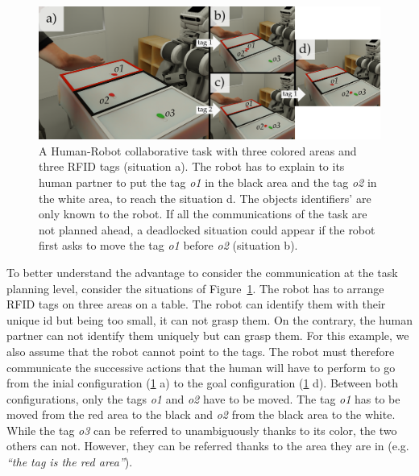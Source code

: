 \begin{figure}[t!]
\centering
\includegraphics[width=\textwidth]{figures/chapter5/intro/intro.png}
\caption{\label{fig:chap5_intro} A Human-Robot collaborative task with three colored areas and three RFID tags (situation a). The robot has to explain to its human partner to put the tag \textit{o1} in the black area and the tag \textit{o2} in the white area, to reach the situation d. The objects identifiers' are only known to the robot.
If all the communications of the task are not planned ahead, a deadlocked situation could appear if the robot first asks to move the tag \textit{o1} before \textit{o2} (situation b).}
\end{figure}

To better understand the advantage to consider the communication at the task planning level, consider the situations of Figure~\ref{fig:chap5_intro}. The robot has to arrange RFID tags on three areas on a table. The robot can identify them with their unique id but being too small, it can not grasp them. On the contrary, the human partner can not identify them uniquely but can grasp them. For this example, we also assume that the robot cannot point to the tags. The robot must therefore communicate the successive actions that the human will have to perform to go from the inial configuration (\ref{fig:chap5_intro} a) to the goal configuration (\ref{fig:chap5_intro} d). Between both configurations, only the tags \textit{o1} and \textit{o2} have to be moved. The tag \textit{o1} has to be moved from the red area to the black and \textit{o2} from the black area to the white. While the tag \textit{o3} can be referred to unambiguously thanks to its color, the two others can not. However, they can be referred thanks to the area they are in (e.g. \textit{``the tag is the red area''}).

